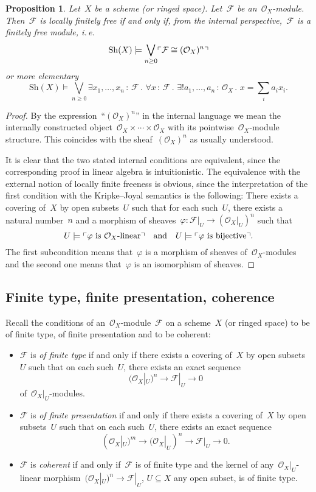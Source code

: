 \documentclass[10pt]{amsart}
\makeatletter
\theoremstyle{definition}
\theoremstyle{plain}
\newtheorem{prop}[defn]{Proposition}
\theoremstyle{remark}
\newcommand{\F}{\mathcal{F}}
\renewcommand{\O}{\mathcal{O}}
\newcommand{\Sh}{\mathrm{Sh}}
\newcommand{\?}{\,{:}\,}
\renewcommand{\_}{\mathpunct{.}\,}
\newcommand{\speak}[1]{\ulcorner\text{\textnormal{#1}}\urcorner}
\newcommand{\ie}{i.\,e.\@\xspace}
\makeatother
\begin{document}
\begin{prop}Let~$X$ be a scheme (or ringed space). Let~$\F$ be
an~$\O_X$-module. Then~$\F$ is locally finitely free if and only if, from the
internal perspective,~$\F$ is a finitely free module, \ie
\[ \Sh(X) \models \bigvee_{n \geq 0} \speak{$\F \cong (\O_X)^n$} \]
or more elementary
\[ \Sh(X) \models \bigvee_{n \geq 0}
  \exists x_1,\ldots,x_n\?\F\_
  \forall x\?\F\_
  \exists! a_1,\ldots,a_n\?\O_X\_
  x = \textstyle\sum\limits_i a_i x_i. \]
\end{prop}
\begin{proof}By the expression~``$(\O_X)^n$'' in the internal language we mean
the internally constructed object~$\O_X \times \cdots \times \O_X$ with its
pointwise~$\O_X$-module structure. This coincides with the sheaf~$(\O_X)^n$ as
usually understood.

It is clear that the two stated internal conditions are equivalent, since the
corresponding proof in linear algebra is intuitionistic. The equivalence with
the external notion of locally finite freeness is obvious, since the
interpretation of the first condition with the Kripke--Joyal semantics is the
following: There exists a covering of~$X$ by open subsets~$U$ such that for
each such~$U$, there exists a natural number~$n$ and a morphism of
sheaves~$\varphi : \F|_U \to (\O_X|_U)^n$ such that
\[ U \models \speak{$\varphi$ is~$\O_X$-linear} \quad\text{and}\quad
  U \models \speak{$\varphi$ is bijective}. \]
The first subcondition means that~$\varphi$ is a morphism of sheaves
of~$\O_X$-modules and the second one means that~$\varphi$ is an isomorphism of
sheaves.
\end{proof}


\subsection{Finite type, finite presentation, coherence}
Recall the conditions of an~$\O_X$-module~$\F$ on a scheme~$X$ (or ringed
space) to be of finite type, of finite presentation and to be coherent:
\begin{itemize}
\item $\F$ is \emph{of finite type} if and only if there exists a covering of~$X$ by
open subsets~$U$ such that on each such~$U$, there exists an exact sequence
\[ (\O_X|_U)^n \longrightarrow \F|_U \longrightarrow 0 \]
of~$\O_X|_U$-modules.
\item $\F$ is \emph{of finite presentation} if and only if there exists a covering of~$X$ by
open subsets~$U$ such that on each such~$U$, there exists an exact sequence
\[ (\O_X|_U)^m \longrightarrow (\O_X|_U)^n \longrightarrow \F|_U \longrightarrow 0. \]
\item $\F$ is \emph{coherent} if and only if~$\F$ is of finite type and the
kernel of any~$\O_X|_U$-linear morphism~$(\O_X|_U)^n \to \F|_U$, $U \subseteq
X$ any open subset, is of finite type.
\end{itemize}
\end{document}
